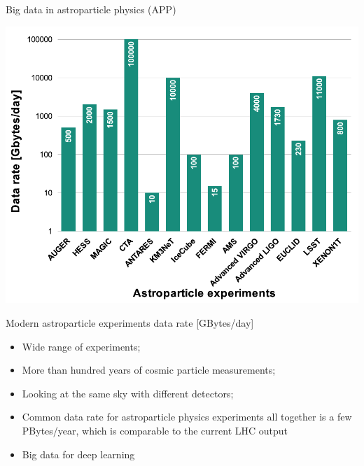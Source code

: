 \begin{frame}{Big data in astroparticle physics (APP)}
    \small
    \begin{minipage}[c]{0.58\textwidth}
        \begin{center}
            \includegraphics[width=1\textwidth]{pics/appec_computing-diagram.pdf}
        \end{center}
        \vspace{-2\parsep}
        \small Modern astroparticle experiments data rate [GBytes/day]\footnotemark[1] %
    \end{minipage}
    \hfill
    \begin{minipage}[c]{0.41\textwidth}
        \begin{itemize}
            \setlength{\itemsep}{0pt}
            \item Wide range of experiments;
            \item More than hundred years of cosmic particle measurements;
            \item Looking at the same sky with different detectors;
            \item Common data rate for astroparticle physics experiments all together is a few PBytes/year, which is comparable to the current LHC output\footnotemark[1]
            \item Big data for deep learning
        \end{itemize}
    \end{minipage}
    \footnotesize{}
\end{frame}

